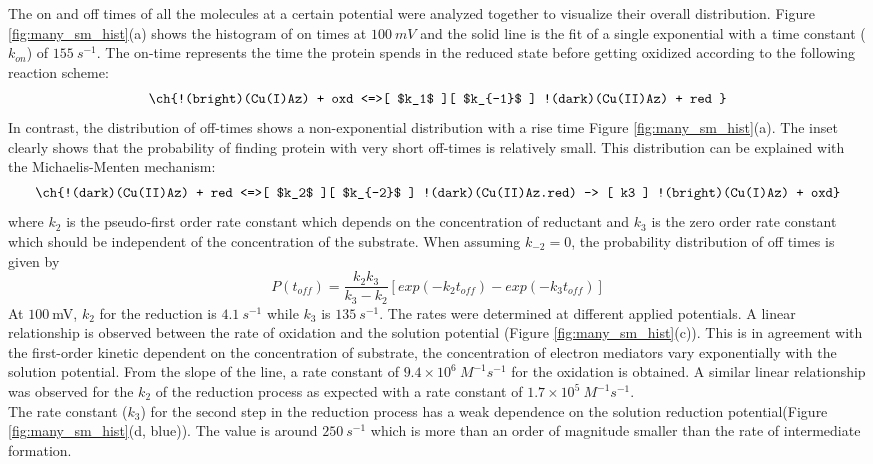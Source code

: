 \documentclass[journal=jacsat,manuscript=article]{achemso}
\begin{document}
The on and off times of all the molecules at a certain potential were analyzed together to visualize their overall distribution. Figure \ref{fig:many_sm_hist}(a) shows the histogram of on times at $100~mV$ and the solid line is the fit of a single exponential with a time constant ($k_{on}$) of $155~s^{-1}$. The on-time represents the time the protein spends in the reduced state before getting oxidized according to the following reaction scheme:
\begin{align}
	\ch{!(bright)(Cu(I)Az) + oxd <=>[ $k_1$ ][ $k_{-1}$ ] !(dark)(Cu(II)Az) + red }
	\label{eq:oxidation}
\end{align}
In contrast, the distribution of off-times shows a non-exponential distribution with a rise time Figure \ref{fig:many_sm_hist}(a). The inset clearly shows that the probability of finding protein with very short off-times is relatively small. This distribution can be explained with the Michaelis-Menten mechanism:
\begin{align}
	\ch{!(dark)(Cu(II)Az) + red <=>[ $k_2$ ][ $k_{-2}$ ] !(dark)(Cu(II)Az.red) -> [ k3 ] !(bright)(Cu(I)Az) + oxd}
	\label{eq:reduction}
\end{align}
where $k_2$ is the pseudo-first order rate constant which depends on the concentration of reductant and $k_3$ is the zero order rate constant which should be independent of the concentration of the substrate. When assuming $k_{-2}=0$, the probability distribution of off times is given by\cite{lu1998single-molecule}
\begin{equation}
	P(t_{off}) = \frac{k_2k_3}{k_3-k_2} [exp(-k_2t_{off})-exp(-k_3t_{off})]
	\label{eq:2exp_risetime}
\end{equation}
At $100~$mV, $k_2$ for the reduction is $4.1~s^{-1}$ while $k_3$ is $135~s^{-1}$. The rates were determined at different applied potentials. A linear relationship is observed between the rate of oxidation and the solution potential (Figure \ref{fig:many_sm_hist}(c)). This is in agreement with the first-order kinetic dependent on the concentration of substrate, the concentration of electron mediators vary exponentially with the solution potential. From the slope of the line, a rate constant of $9.4\times10^6~M^{-1}s^{-1}$ for the oxidation is obtained. A similar linear relationship was observed for the $k_2$ of the reduction process as expected with a rate constant of $1.7\times10^5~M^{-1}s^{-1}$.\\
The rate constant ($k_3$) for the second step in the reduction process has a weak dependence on the solution reduction potential(Figure \ref{fig:many_sm_hist}(d, blue)). The value is around $250~s^{-1}$ which is more than an order of magnitude smaller than the rate of intermediate formation.\\
\end{document}
